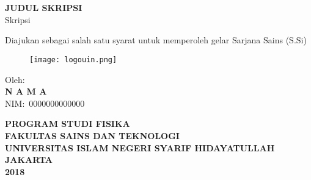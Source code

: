 \chapter*{}
\thispagestyle{empty}
\begin{center}
    {\textbf{\Large JUDUL SKRIPSI}}\\
    \vspace{2cm}
    {\large Skripsi}

    Diajukan sebagai salah satu syarat untuk memperoleh gelar Sarjana Sains (S.Si)

    \begin{figure}[H]
        \centering
        \vspace{1cm}
        \texttt{[image: logouin.png]}\label{fig:logouin}\\
        \vspace{2cm}
    \end{figure}

    Oleh:\\
    \textbf{N A M A}\\
    NIM:\ 0000000000000\\
    \vfill

    {%
    \bfseries 
        PROGRAM STUDI FISIKA\\
        FAKULTAS SAINS DAN TEKNOLOGI\\
        UNIVERSITAS ISLAM NEGERI SYARIF HIDAYATULLAH\\
        JAKARTA\\
        2018\\
    }
\end{center}

